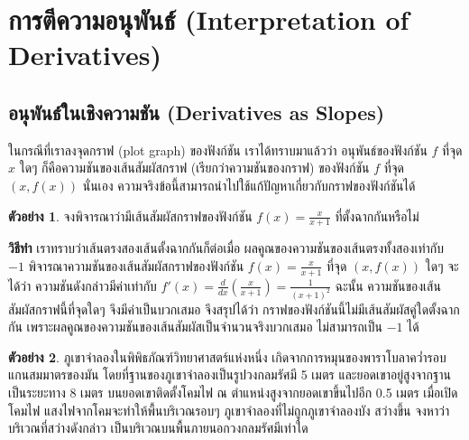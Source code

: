 \documentclass[
]{book}
\theoremstyle{definition}
\theoremstyle{definition}
\newtheorem{example}{ตัวอย่าง}[chapter]
\theoremstyle{definition}
\theoremstyle{definition}
\theoremstyle{remark}
\begin{document}
\section{การตีความอนุพันธ์ (Interpretation of Derivatives)}\label{uxe01uxe32uxe23uxe15uxe04uxe27uxe32uxe21uxe2duxe19uxe1euxe19uxe18-interpretation-of-derivatives}

\subsection{อนุพันธ์ในเชิงความชัน (Derivatives as Slopes)}\label{uxe2duxe19uxe1euxe19uxe18uxe43uxe19uxe40uxe0auxe07uxe04uxe27uxe32uxe21uxe0auxe19-derivatives-as-slopes}

ในกรณีที่เราลงจุดกราฟ (plot graph) ของฟังก์ชัน เราได้ทราบมาแล้วว่า อนุพันธ์ของฟังก์ชัน
\(f\) ที่จุด \(x\) ใดๆ ก็คือความชันของเส้นสัมผัสกราฟ (เรียกว่าความชันของกราฟ) ของฟังก์ชัน
\(f\) ที่จุด \((x,f(x))\) นั่นเอง
ความจริงข้อนี้สามารถนำไปใช้แก้ปัญหาเกี่ยวกับกราฟของฟังก์ชันได้

\begin{example}
จงพิจารณาว่ามีเส้นสัมผัสกราฟของฟังก์ชัน \(\displaystyle f(x)=\frac{x}{x+1}\)
ที่ตั้งฉากกันหรือไม่
\end{example}

\textbf{วิธีทำ} เราทราบว่าเส้นตรงสองเส้นตั้งฉากกันก็ต่อเมื่อ
ผลคูณของความชันของเส้นตรงทั้งสองเท่ากับ \(-1\) พิจารณาความชันของเส้นสัมผัสกราฟของฟังก์ชัน
\(\displaystyle f(x)=\frac{x}{x+1}\) ที่จุด \((x,f(x))\) ใดๆ จะได้ว่า
ความชันดังกล่าวมีค่าเท่ากับ
\(\displaystyle f'(x)=\frac{d}{dx}\left(\frac{x}{x+1}\right)=\frac{1}{(x+1)^2}\)
ฉะนั้น ความชันของเส้นสัมผัสกราฟนี้ที่จุดใดๆ จึงมีค่าเป็นบวกเสมอ จึงสรุปได้ว่า
กราฟของฟังก์ชันนี้ไม่มีเส้นสัมผัสคู่ใดตั้งฉากกัน
เพราะผลคูณของความชันของเส้นสัมผัสเป็นจำนวนจริงบวกเสมอ ไม่สามารถเป็น \(-1\) ได้

\begin{example}
ภูเขาจำลองในพิพิธภัณฑ์วิทยาศาสตร์แห่งหนึ่ง
เกิดจากการหมุนของพาราโบลาคว่ำรอบแกนสมมาตรของมัน
โดยที่ฐานของภูเขาจำลองเป็นรูปวงกลมรัศมี 5 เมตร และยอดเขาอยู่สูงจากฐานเป็นระยะทาง 8
เมตร บนยอดเขาติดตั้งโคมไฟ ณ ตำแหน่งสูงจากยอดเขาขึ้นไปอีก 0.5 เมตร เมื่อเปิดโคมไฟ
แสงไฟจากโคมจะทำให้พื้นบริเวณรอบๆ ภูเขาจำลองที่ไม่ถูกภูเขาจำลองบัง สว่างขึ้น
จงหาว่าบริเวณที่สว่างดังกล่าว เป็นบริเวณบนพื้นภายนอกวงกลมรัศมีเท่าใด
\end{example}
\end{document}
